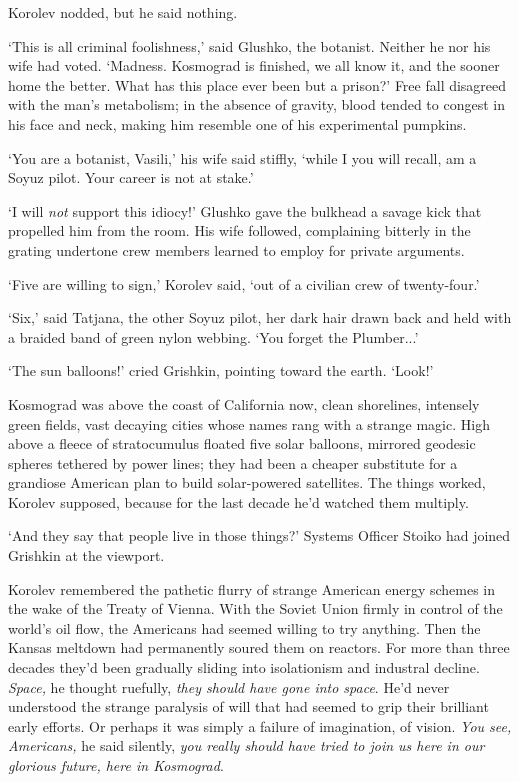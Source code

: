 Korolev nodded, but he said nothing.

`This is all criminal foolishness,' said Glushko, the botanist. Neither he nor his wife had voted. `Madness. Kosmograd is finished, we all know it, and the sooner home the better. What has this place ever been but a prison?' Free fall disagreed with the man's metabolism; in the absence of gravity, blood tended to congest in his face and neck, making him resemble one of his experimental pumpkins.

`You are a botanist, Vasili,' his wife said stiffly, `while I you will recall, am a Soyuz pilot. Your career is not at stake.'

`I will \textit{not} support this idiocy!' Glushko gave the bulkhead a savage kick that propelled him from the room. His wife followed, complaining bitterly in the grating undertone crew members learned to employ for private arguments.

`Five are willing to sign,' Korolev said, `out of a civilian crew of twenty-four.'

`Six,' said Tatjana, the other Soyuz pilot, her dark hair drawn back and held with a braided band of green nylon webbing. `You forget the Plumber...'

`The sun balloons!' cried Grishkin, pointing toward the earth. `Look!'

Kosmograd was above the coast of California now, clean shorelines, intensely green fields, vast decaying cities whose names rang with a strange magic. High above a fleece of stratocumulus floated five solar balloons, mirrored geodesic spheres tethered by power lines; they had been a cheaper substitute for a grandiose American plan to build solar-powered satellites. The things worked, Korolev supposed, because for the last decade he'd watched them multiply.

`And they say that people live in those things?' Systems Officer Stoiko had joined Grishkin at the viewport.

Korolev remembered the pathetic flurry of strange American energy schemes in the wake of the Treaty of Vienna. With the Soviet Union firmly in control of the world's oil flow, the Americans had seemed willing to try anything. Then the Kansas meltdown had permanently soured them on reactors. For more than three decades they'd been gradually sliding into isolationism and industral decline. \textit{Space,} he thought ruefully, \textit{they should have gone into space}. He'd never understood the strange paralysis of will that had seemed to grip their brilliant early efforts. Or perhaps it was simply a failure of imagination, of vision. \textit{You see, Americans,} he said silently, \textit{you really should have tried to join us here in our glorious future, here in Kosmograd}.

